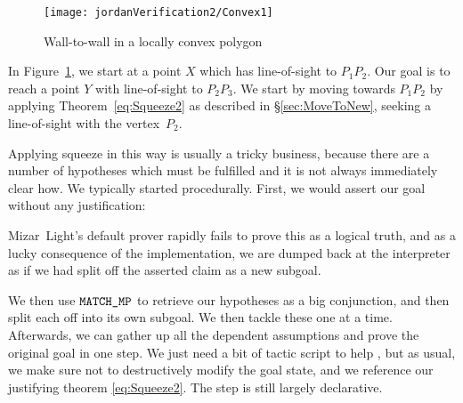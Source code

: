 \begin{figure}
\centering\texttt{[image: jordanVerification2/Convex1]}
\caption{Wall-to-wall in a locally convex polygon}
\label{fig:Convex1}
\end{figure}

In Figure~\ref{fig:Convex1}, we start at a point $X$ which has line-of-sight to $P_1P_2$. Our goal is to reach a point $Y$ with line-of-sight to $P_2P_3$. We start by moving towards $P_1P_2$ by applying Theorem~\ref{eq:Squeeze2} as described in \S\ref{sec:MoveToNew}, seeking a line-of-sight with the vertex~$P_2$. 

Applying squeeze in this way is usually a tricky business, because there are a number of hypotheses which must be fulfilled and it is not always immediately clear how. We typically started procedurally. First, we would assert our goal without any justification:


Mizar~Light's default prover rapidly fails to prove this as a logical truth, and as a lucky consequence of the implementation, we are dumped back at the interpreter as if we had split off the asserted claim as a new subgoal. 

We then use $\texttt{MATCH\_MP}$ to retrieve our hypotheses as a big conjunction, and then split each off into its own subgoal. We then tackle these one at a time. Afterwards, we can gather up all the dependent assumptions and prove the original goal in one step. We just need a bit of tactic script to help , but as usual, we make sure not to destructively modify the goal state, and we reference our justifying theorem \eqref{eq:Squeeze2}. The step is still largely declarative.

